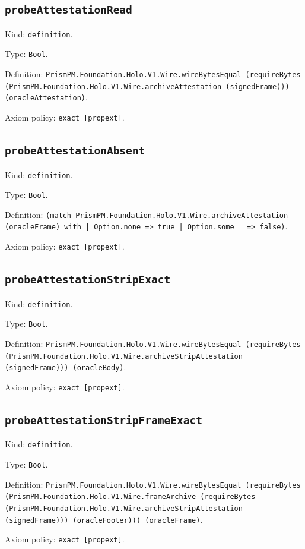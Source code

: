 \documentclass[11pt]{article}
\begin{document}
\subsection*{\texttt{probeAttestationRead}}
\noindent Kind: \texttt{definition}.\par
\noindent Type: \texttt{Bool}.\par
\noindent Definition: \texttt{PrismPM.Foundation.Holo.V1.Wire.wireBytesEqual (requireBytes (PrismPM.Foundation.Holo.V1.Wire.archiveAttestation (signedFrame))) (oracleAttestation)}.\par
\noindent Axiom policy: \texttt{exact [propext]}.\par
\subsection*{\texttt{probeAttestationAbsent}}
\noindent Kind: \texttt{definition}.\par
\noindent Type: \texttt{Bool}.\par
\noindent Definition: \texttt{(match PrismPM.Foundation.Holo.V1.Wire.archiveAttestation (oracleFrame) with | Option.none => true | Option.some \_ => false)}.\par
\noindent Axiom policy: \texttt{exact [propext]}.\par
\subsection*{\texttt{probeAttestationStripExact}}
\noindent Kind: \texttt{definition}.\par
\noindent Type: \texttt{Bool}.\par
\noindent Definition: \texttt{PrismPM.Foundation.Holo.V1.Wire.wireBytesEqual (requireBytes (PrismPM.Foundation.Holo.V1.Wire.archiveStripAttestation (signedFrame))) (oracleBody)}.\par
\noindent Axiom policy: \texttt{exact [propext]}.\par
\subsection*{\texttt{probeAttestationStripFrameExact}}
\noindent Kind: \texttt{definition}.\par
\noindent Type: \texttt{Bool}.\par
\noindent Definition: \texttt{PrismPM.Foundation.Holo.V1.Wire.wireBytesEqual (requireBytes (PrismPM.Foundation.Holo.V1.Wire.frameArchive (requireBytes (PrismPM.Foundation.Holo.V1.Wire.archiveStripAttestation (signedFrame))) (oracleFooter))) (oracleFrame)}.\par
\noindent Axiom policy: \texttt{exact [propext]}.\par
\end{document}
